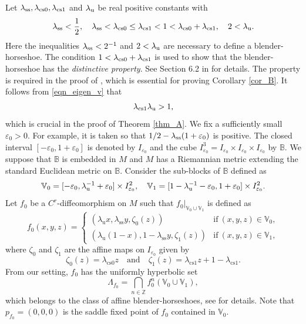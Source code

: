 \documentclass{amsart}
\theoremstyle{plain}
\theoremstyle{definition}
\theoremstyle{remark}
\numberwithin{equation}{section}
\begin{document}
 
Let $\lambda_{\rm ss}, \lambda_{\rm cs0}, \lambda_{\rm cs1}$ and $\lambda_{\rm u}$ 
be real positive constants with
\begin{equation}\label{eqn_eigen_v}
\lambda_{\rm ss}<\frac12,\quad
\lambda_{\rm ss}<\lambda_{\rm cs0}\leq \lambda_{\rm cs1}<1<\lambda_{\rm cs0}+\lambda_{\rm cs1},\quad 2<\lambda_{\rm u}.
\end{equation}
Here the inequalities $\lambda_{\rm ss}<2^{-1}$ and $2<\lambda_{\rm u}$ are necessary to define a blender-horseshoe.
The condition $1<\lambda_{{\rm cs}0}+\lambda_{{\rm cs}1}$ is used to show that the blender-horseshoe has the \emph{distinctive property}.  
See Section 6.2 in \cite{BDV05} for details.
The property is required in the proof of \cite[Theorem B]{KNS}, 
which is essential for proving Corollary \ref{cor_B}.
It follows from \eqref{eqn_eigen_v} that   
\begin{equation}\label{eqn_lamcs1}
\lambda_{\rm cs1}\lambda_{\rm u}>1,
\end{equation}
which is crucial in the proof of Theorem \ref{thm_A}.
We fix a sufficiently small  $\varepsilon_0>0$.
For example, it is taken so that $1/2-\lambda_{\rm ss}(1+\varepsilon_0)$ is positive.
The closed interval $[-\varepsilon_{0},1+\varepsilon_{0}]$ is denoted by  $I_{\varepsilon_{0}}$ 
and the cube $I_{\varepsilon_{0}}^{3}=I_{\varepsilon_{0}}\times I_{\varepsilon_{0}}\times I_{\varepsilon_{0}}$ by $\mathbb{B}$.
We suppose that $\mathbb{B}$ is embedded in $M$ 
and $M$ has a Riemannian metric extending the standard Euclidean metric on $\mathbb{B}$.
Consider the sub-blocks of $\mathbb{B}$ defined as 
\[
\mathbb{V}_{0}= [-\varepsilon_{0}, \lambda_{\rm u}^{-1}+\varepsilon_0]\times I_{\varepsilon_{0}}^{2},\quad 
\mathbb{V}_{1}= [1-\lambda_{\rm u}^{-1}-\varepsilon_0,1+\varepsilon_{0}]\times I_{\varepsilon_{0}}^{2}. 
\]
Let $f_{0}$ be a $C^r$-diffeomorphism on $M$ such that $f_{0}|_{\mathbb{V}_{0}\cup \mathbb{V}_{1}}$ is defined as
\begin{equation}\label{eqn_f0V}
f_{0}(x,y,z)=
\begin{cases}
(\lambda_{\mathrm{u}}x,\lambda_{\mathrm{ss}}y,\zeta_0(z))&\text{if}\ (x,y,z)\in \mathbb{V}_{0},\\
(\lambda_{\mathrm{u}}(1-x),1-\lambda_{\mathrm{ss}}y,\zeta_1(z)) &\text{if}\ (x,y,z)\in \mathbb{V}_{1},
\end{cases}
\end{equation} 
where 
$\zeta_0$ and $\zeta_1$ are the affine maps on $I_{\varepsilon_0}$ given by
\[
\zeta_0(z)=\lambda_{\mathrm{cs} 0}z\quad\text{and}\quad \zeta_1(z)=\lambda_{\mathrm{cs} 1}z+1-\lambda_{\mathrm{cs} 1}.
\]
From our setting, $f_{0}$ has the uniformly hyperbolic set  
\[
\Lambda_{f_{0}}=\bigcap_{n\in \mathbb{Z}} f_{0}^n(\mathbb{V}_{0}\cup \mathbb{V}_{1}),
\]
which belongs to the class of affine blender-horseshoes, see \cite{BD96,BD12} for details. 
Note that $p_{f_0}=(0,0,0)$ is the saddle fixed point of $f_0$ contained in $\mathbb{V}_0$.
\end{document}
